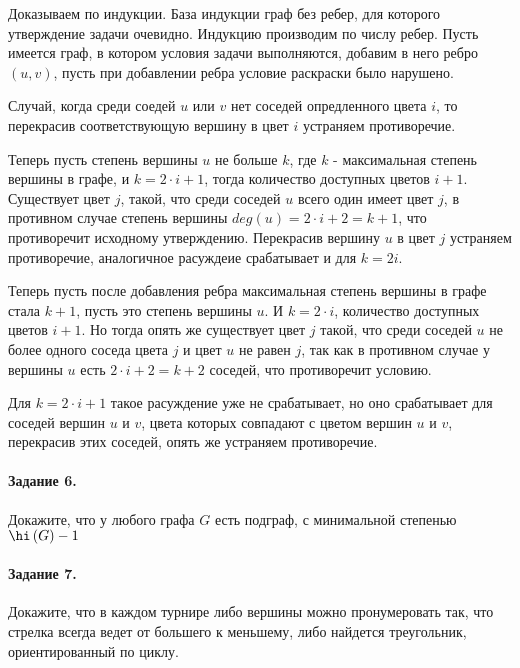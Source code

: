 \documentclass[a4paper,12pt]{article}
\begin{document}
\begin{Solution}
Доказываем по индукции. База индукции граф без ребер, для которого утверждение задачи очевидно. Индукцию производим по числу ребер. Пусть имеется граф, в котором условия задачи выполняются, добавим в него ребро $(u,v)$, пусть при добавлении ребра условие раскраски было нарушено.

Случай, когда среди соедей $u$ или $v$ нет соседей опредленного цвета $i$, то перекрасив соответствующую вершину в цвет $i$ устраняем противоречие.

Теперь пусть степень вершины $u$ не больше $k$, где $k$ - максимальная степень вершины в графе, и $k = 2\cdot i + 1$, тогда количество доступных цветов $i + 1$. Существует цвет $j$, такой, что среди соседей $u$ всего один имеет цвет $j$, в противном случае степень вершины $deg\left(u\right) = 2\cdot i + 2 = k + 1$, что противоречит исходному утверждению. Перекрасив вершину $u$ в цвет $j$ устраняем противоречие, аналогичное расуждеие срабатывает и для $k = 2i$.

Теперь пусть после добавления ребра максимальная степень вершины в графе стала $k+1$, пусть это степень вершины $u$. И $k = 2 \cdot i$, количество доступных цветов $i + 1$. Но тогда опять же существует цвет $j$ такой, что среди соседей $u$ не более одного соседа цвета $j$ и цвет $u$ не равен $j$, так как в противном случае у вершины $u$ есть $2 \cdot i + 2 = k + 2$ соседей, что противоречит условию.

Для $k = 2\cdot i + 1$ такое расуждение уже не срабатывает, но оно срабатывает для соседей вершин $u$ и $v$, цвета которых совпадают с цветом вершин $u$ и $v$, перекрасив этих соседей, опять же устраняем противоречие.
\end{Solution}

\paragraph{Задание 6.} Докажите, что у любого графа $G$ есть подграф, с минимальной степенью $\hi \left(G\right) - 1$

\begin{Solution}

\end{Solution}

\paragraph{Задание 7.} Докажите, что в каждом турнире либо вершины можно пронумеровать так, что стрелка всегда ведет от большего к меньшему, либо найдется треугольник, ориентированный по циклу.
\end{document}
